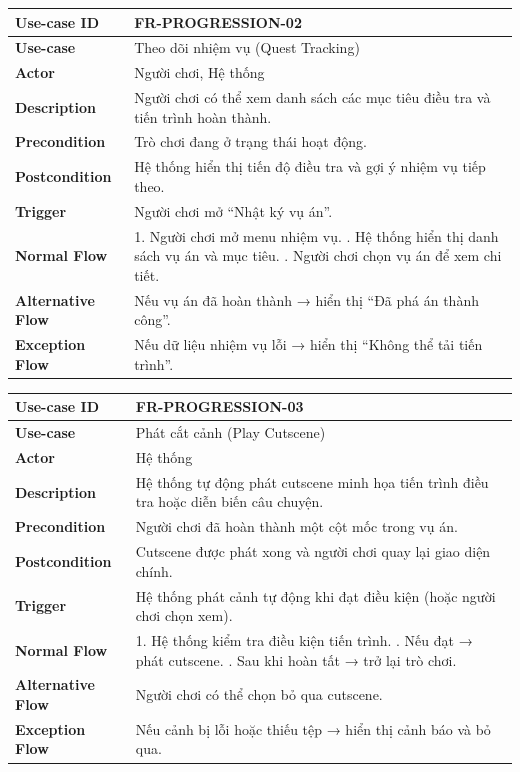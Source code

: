 \begin{table}[H]
\centering
\begin{tabular}{|p{4cm}|p{10cm}|}
\hline
\textbf{Use-case ID} & FR-PROGRESSION-02 \\ \hline
\textbf{Use-case} & Theo dõi nhiệm vụ (Quest Tracking) \\ \hline
\textbf{Actor} & Người chơi, Hệ thống \\ \hline
\textbf{Description} & Người chơi có thể xem danh sách các mục tiêu điều tra và tiến trình hoàn thành. \\ \hline
\textbf{Precondition} & Trò chơi đang ở trạng thái hoạt động. \\ \hline
\textbf{Postcondition} & Hệ thống hiển thị tiến độ điều tra và gợi ý nhiệm vụ tiếp theo. \\ \hline
\textbf{Trigger} & Người chơi mở “Nhật ký vụ án”. \\ \hline
\textbf{Normal Flow} &
1. Người chơi mở menu nhiệm vụ. \newline
2. Hệ thống hiển thị danh sách vụ án và mục tiêu. \newline
3. Người chơi chọn vụ án để xem chi tiết. \\ \hline
\textbf{Alternative Flow} &
Nếu vụ án đã hoàn thành → hiển thị “Đã phá án thành công”. \\ \hline
\textbf{Exception Flow} &
Nếu dữ liệu nhiệm vụ lỗi → hiển thị “Không thể tải tiến trình”. \\ \hline
\end{tabular}
\end{table}


\begin{table}[H]
\centering
\begin{tabular}{|p{4cm}|p{10cm}|}
\hline
\textbf{Use-case ID} & FR-PROGRESSION-03 \\ \hline
\textbf{Use-case} & Phát cắt cảnh (Play Cutscene) \\ \hline
\textbf{Actor} & Hệ thống \\ \hline
\textbf{Description} & Hệ thống tự động phát cutscene minh họa tiến trình điều tra hoặc diễn biến câu chuyện. \\ \hline
\textbf{Precondition} & Người chơi đã hoàn thành một cột mốc trong vụ án. \\ \hline
\textbf{Postcondition} & Cutscene được phát xong và người chơi quay lại giao diện chính. \\ \hline
\textbf{Trigger} & Hệ thống phát cảnh tự động khi đạt điều kiện (hoặc người chơi chọn xem). \\ \hline
\textbf{Normal Flow} &
1. Hệ thống kiểm tra điều kiện tiến trình. \newline
2. Nếu đạt → phát cutscene. \newline
3. Sau khi hoàn tất → trở lại trò chơi. \\ \hline
\textbf{Alternative Flow} &
Người chơi có thể chọn bỏ qua cutscene. \\ \hline
\textbf{Exception Flow} &
Nếu cảnh bị lỗi hoặc thiếu tệp → hiển thị cảnh báo và bỏ qua. \\ \hline
\end{tabular}
\end{table}


